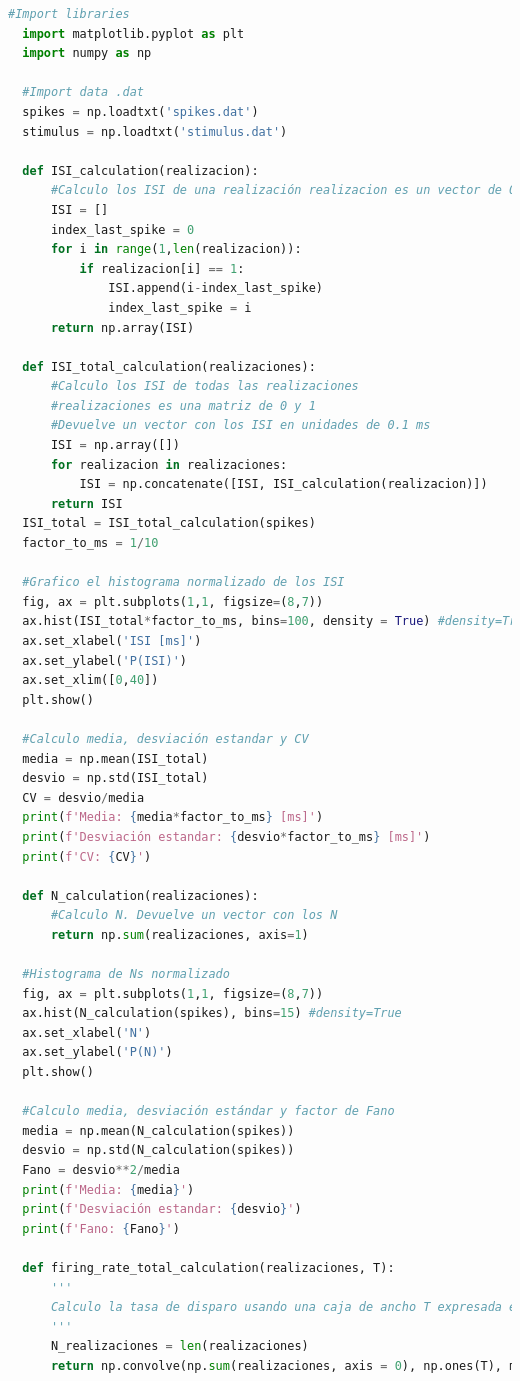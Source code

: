 \documentclass[aps,prb,twocolumn,superscriptaddress,floatfix,longbibliography]{revtex4-2}
\begin{document}
\begin{lstlisting}[language=Python]
  #Import libraries
  import matplotlib.pyplot as plt
  import numpy as np
  
  #Import data .dat
  spikes = np.loadtxt('spikes.dat')
  stimulus = np.loadtxt('stimulus.dat')
  
  def ISI_calculation(realizacion):
      #Calculo los ISI de una realización realizacion es un vector de 0 y 1. Devuelve un vector con los ISI en unidades de 0.1 ms
      ISI = []
      index_last_spike = 0
      for i in range(1,len(realizacion)):
          if realizacion[i] == 1:
              ISI.append(i-index_last_spike)
              index_last_spike = i
      return np.array(ISI)
  
  def ISI_total_calculation(realizaciones):
      #Calculo los ISI de todas las realizaciones
      #realizaciones es una matriz de 0 y 1
      #Devuelve un vector con los ISI en unidades de 0.1 ms
      ISI = np.array([])
      for realizacion in realizaciones:
          ISI = np.concatenate([ISI, ISI_calculation(realizacion)])
      return ISI
  ISI_total = ISI_total_calculation(spikes)
  factor_to_ms = 1/10
  
  #Grafico el histograma normalizado de los ISI
  fig, ax = plt.subplots(1,1, figsize=(8,7))
  ax.hist(ISI_total*factor_to_ms, bins=100, density = True) #density=True
  ax.set_xlabel('ISI [ms]')
  ax.set_ylabel('P(ISI)')
  ax.set_xlim([0,40])
  plt.show()
  
  #Calculo media, desviación estandar y CV
  media = np.mean(ISI_total)
  desvio = np.std(ISI_total)
  CV = desvio/media
  print(f'Media: {media*factor_to_ms} [ms]')
  print(f'Desviación estandar: {desvio*factor_to_ms} [ms]')
  print(f'CV: {CV}')
  
  def N_calculation(realizaciones):
      #Calculo N. Devuelve un vector con los N
      return np.sum(realizaciones, axis=1)
  
  #Histograma de Ns normalizado
  fig, ax = plt.subplots(1,1, figsize=(8,7))
  ax.hist(N_calculation(spikes), bins=15) #density=True
  ax.set_xlabel('N')
  ax.set_ylabel('P(N)')
  plt.show()
  
  #Calculo media, desviación estándar y factor de Fano
  media = np.mean(N_calculation(spikes))
  desvio = np.std(N_calculation(spikes))
  Fano = desvio**2/media
  print(f'Media: {media}')
  print(f'Desviación estandar: {desvio}')
  print(f'Fano: {Fano}')
  
  def firing_rate_total_calculation(realizaciones, T):
      '''
      Calculo la tasa de disparo usando una caja de ancho T expresada en unidades de 0.1 ms, es decir, como índice. Tiene que ser múltiplo de 2
      '''
      N_realizaciones = len(realizaciones)
      return np.convolve(np.sum(realizaciones, axis = 0), np.ones(T), mode = "same")/T/N_realizaciones
  

\end{lstlisting}
\end{document}
